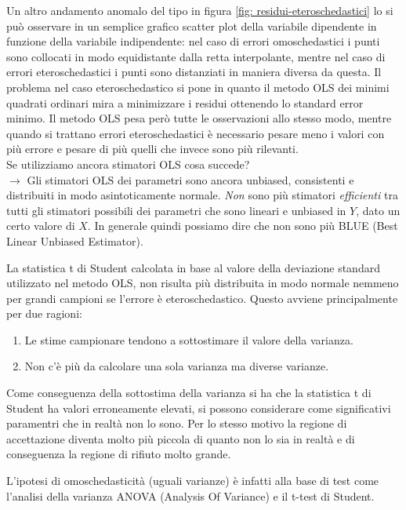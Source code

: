 \documentclass[]{article}
\begin{document}
Un altro andamento anomalo del tipo in figura \ref{fig: residui-eteroschedastici} lo si può osservare in un semplice grafico scatter plot della variabile dipendente in funzione della variabile indipendente: nel caso di errori omoschedastici i punti sono collocati in modo equidistante dalla retta interpolante, mentre nel caso di errori eteroschedastici i punti sono distanziati in maniera diversa da questa. Il problema nel caso eteroschedastico si pone in quanto il metodo OLS dei minimi quadrati ordinari mira a minimizzare i residui ottenendo lo standard error minimo. Il metodo OLS pesa però tutte le osservazioni allo stesso modo, mentre quando si trattano errori eteroschedastici è necessario pesare meno i valori con più errore e pesare di più quelli che invece sono più rilevanti.\\
Se utilizziamo ancora stimatori OLS cosa succede?\\
$\rightarrow$ Gli stimatori OLS dei parametri sono ancora unbiased, consistenti e distribuiti in modo asintoticamente normale. \textit{Non} sono più stimatori \textit{efficienti} tra tutti gli stimatori possibili dei parametri che sono lineari e unbiased in $Y$, dato un certo valore di $X$. In generale quindi possiamo dire che non sono più BLUE (Best Linear Unbiased Estimator).

La statistica t di Student calcolata in base al valore della deviazione standard utilizzato nel metodo OLS, non risulta più distribuita in modo normale nemmeno per grandi campioni se l'errore è eteroschedastico. Questo avviene principalmente per due ragioni:
\begin{enumerate}
\item Le stime campionare tendono a sottostimare il valore della varianza.
\item Non c'è più da calcolare una sola varianza ma diverse varianze.
\end{enumerate}

Come conseguenza della sottostima della varianza si ha che la statistica t di Student ha valori erroneamente elevati, si possono considerare come significativi paramentri che in realtà non lo sono. Per lo stesso motivo la regione di accettazione diventa molto più piccola di quanto non lo sia in realtà e di conseguenza la regione di rifiuto molto grande.

L'ipotesi di omoschedasticità (uguali varianze) è  infatti alla base di test come l'analisi della varianza ANOVA (Analysis Of Variance) e il t-test di Student.
\end{document}
